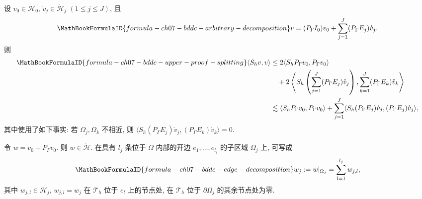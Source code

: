\begin{Proof}
设 $v_0\in\mathcal H_0$, $\mathring v_j\in\mathring{\mathcal H}_j$ $(1\leq j\leq J)$, 且
\[
\MathBookFormulaID{formula-ch07-bddc-arbitrary-decomposition}
v=(P_\Gamma I_0)v_0+\sum_{j=1}^{J}(P_\Gamma E_j)\mathring v_j.
\]
则
\begin{align}
\MathBookFormulaID{formula-ch07-bddc-upper-proof-splitting}
\langle S_hv,v\rangle
&\leq2\langle S_hP_\Gamma v_0,P_\Gamma v_0\rangle\notag\\
&\quad+2\left\langle S_h\left(\sum_{j=1}^{J}(P_\Gamma E_j)\mathring v_j\right),
\sum_{k=1}^{J}(P_\Gamma E_k)\mathring v_k\right\rangle\notag\\
&\lesssim\langle S_hP_\Gamma v_0,P_\Gamma v_0\rangle
+\sum_{j=1}^{J}\langle S_h(P_\Gamma E_j)\mathring v_j,(P_\Gamma E_j)\mathring v_j\rangle,
\label{eq:ch07-bddc-upper-proof-splitting}
\end{align}
其中使用了如下事实: 若 $\Omega_j,\Omega_k$ 不相近, 则 $\langle S_h(P_\Gamma E_j)\mathring v_j,(P_\Gamma E_k)\mathring v_k\rangle=0$.

令 $w=v_0-P_\Gamma v_0$. 则 $w\in\mathring{\mathcal H}$. 在具有 $l_j$ 条位于 $\Omega$ 内部的开边 $e_1,\ldots,e_{l_j}$ 的子区域 $\Omega_j$ 上, 可写成
\begin{equation}
\MathBookFormulaID{formula-ch07-bddc-edge-decomposition}
\label{eq:ch07-bddc-edge-decomposition}
w_j:=w|_{\Omega_j}=\sum_{l=1}^{l_j}w_{j,l},
\end{equation}
其中 $w_{j,l}\in\mathcal H_j$, $w_{j,l}=w_j$ 在 $\mathcal T_h$ 位于 $e_l$ 上的节点处, 在 $\mathcal T_h$ 位于 $\partial\Omega_j$ 的其余节点处为零.


\end{Proof}
